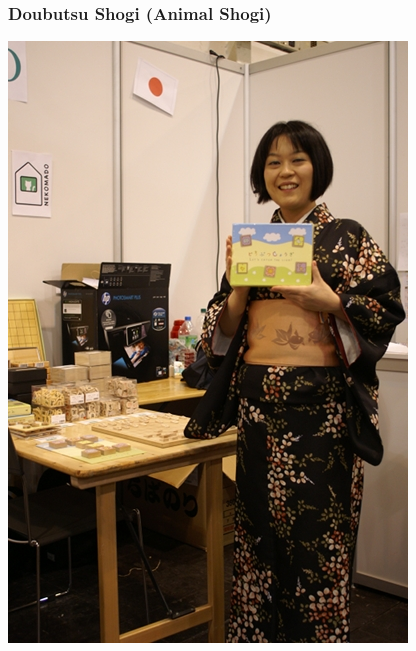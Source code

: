 \documentclass{beamer}
\begin{document}
\begin{frame}
\frametitle{Doubutsu Shogi (Animal Shogi)}
\begin{center}
\includegraphics[scale = 0.2]{Madokakitao.jpg}
\hspace{1in}

\end{center}
\end{frame}
\end{document}
